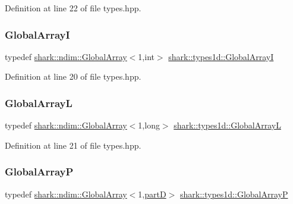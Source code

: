 Definition at line 22 of file types.\+hpp.

\hypertarget{namespaceshark_1_1types1d_a458fc07a86392a11eff6b5c1bf5b7e5d}{}\label{namespaceshark_1_1types1d_a458fc07a86392a11eff6b5c1bf5b7e5d} 
\subsubsection{\texorpdfstring{Global\+ArrayI}{GlobalArrayI}}
{\footnotesize\ttfamily typedef \hyperlink{classshark_1_1ndim_1_1_global_array}{shark\+::ndim\+::\+Global\+Array}$<$1,int$>$ \hyperlink{namespaceshark_1_1types1d_a458fc07a86392a11eff6b5c1bf5b7e5d}{shark\+::types1d\+::\+Global\+ArrayI}}



Definition at line 20 of file types.\+hpp.

\hypertarget{namespaceshark_1_1types1d_a046807c9a181ac7344006937697a5ad5}{}\label{namespaceshark_1_1types1d_a046807c9a181ac7344006937697a5ad5} 
\subsubsection{\texorpdfstring{Global\+ArrayL}{GlobalArrayL}}
{\footnotesize\ttfamily typedef \hyperlink{classshark_1_1ndim_1_1_global_array}{shark\+::ndim\+::\+Global\+Array}$<$1,long$>$ \hyperlink{namespaceshark_1_1types1d_a046807c9a181ac7344006937697a5ad5}{shark\+::types1d\+::\+Global\+ArrayL}}



Definition at line 21 of file types.\+hpp.

\hypertarget{namespaceshark_1_1types1d_aae323368f0f77f7f1d118a70156cf8f4}{}\label{namespaceshark_1_1types1d_aae323368f0f77f7f1d118a70156cf8f4} 
\subsubsection{\texorpdfstring{Global\+ArrayP}{GlobalArrayP}}
{\footnotesize\ttfamily typedef \hyperlink{classshark_1_1ndim_1_1_global_array}{shark\+::ndim\+::\+Global\+Array}$<$1,\hyperlink{namespaceshark_1_1types1d_a46775e0f758bf283c37ef3733ac9e294}{partD}$>$ \hyperlink{namespaceshark_1_1types1d_aae323368f0f77f7f1d118a70156cf8f4}{shark\+::types1d\+::\+Global\+ArrayP}}



